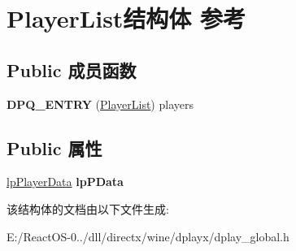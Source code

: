 \hypertarget{struct_player_list}{}\section{Player\+List结构体 参考}
\label{struct_player_list}
\subsection*{Public 成员函数}
\begin{DoxyCompactItemize}
\item 
\mbox{\label{struct_player_list_ad253ceebcb16f1f9a20dd7d8ddc64377}} 
{\bfseries D\+P\+Q\+\_\+\+E\+N\+T\+RY} (\hyperlink{struct_player_list}{Player\+List}) players
\end{DoxyCompactItemize}
\subsection*{Public 属性}
\begin{DoxyCompactItemize}
\item 
\mbox{\label{struct_player_list_a3b33589ad77fc78f848b6cc83621df47}} 
\hyperlink{struct_player_data}{lp\+Player\+Data} {\bfseries lp\+P\+Data}
\end{DoxyCompactItemize}


该结构体的文档由以下文件生成\+:\begin{DoxyCompactItemize}
\item 
E\+:/\+React\+O\+S-\/0../dll/directx/wine/dplayx/dplay\+\_\+global.\+h\end{DoxyCompactItemize}

